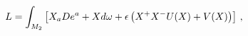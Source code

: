 \begin{equation}
\hspace*{-0.8truecm}L = \int_{M_2} \left[ X_a De^a + X d\omega + \epsilon \left(X^+X^-U(X)+V(X)\right) \right]\,,
\label{2.62}
\end{equation}

